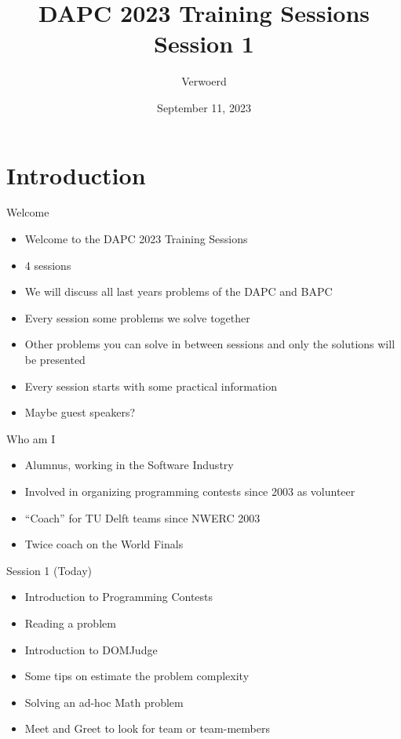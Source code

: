 \documentclass[11pt,pdf, aspectratio=169]{beamer}
\title{DAPC 2023 Training Sessions\\Session 1}
\author{Verwoerd}
\date{September 11, 2023}
\begin{document}
  \maketitle


  \section{Introduction}
  \begin{frame}{Welcome}
    \begin{itemize}
      \item Welcome to the DAPC 2023 Training Sessions
      \item 4 sessions
      \item We will discuss all last years problems of the DAPC and BAPC
      \item Every session some problems we solve together
      \item Other problems you can solve in between sessions and only the solutions will be presented
      \item Every session starts with some practical information
      \item Maybe guest speakers?
    \end{itemize}
  \end{frame}
  \begin{frame}{Who am I}
    \begin{itemize}
      \item Alumnus, working in the Software Industry
      \item Involved in organizing programming contests since 2003 as volunteer
      \item ``Coach'' for TU Delft teams since NWERC 2003
      \item Twice coach on the World Finals
    \end{itemize}
    \doclicenseThis
  \end{frame}
  \begin{frame}{Session 1 (Today)}
    \begin{itemize}
      \item Introduction to Programming Contests
      \item Reading a problem
      \item Introduction to DOMJudge
      \item Some tips on estimate the problem complexity
      \item Solving an ad-hoc Math problem
      \item Meet and Greet to look for team or team-members
    \end{itemize}
  \end{frame}
\end{document}
